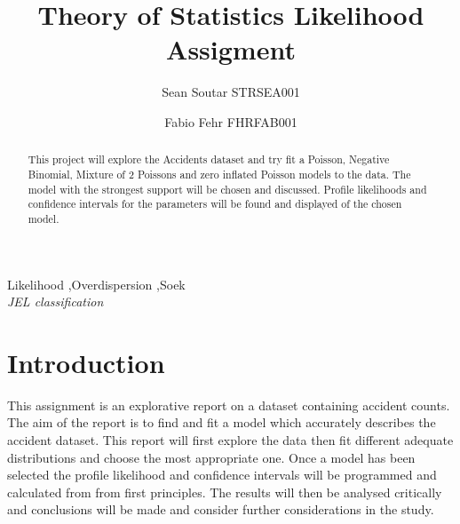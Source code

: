 \documentclass[11pt,preprint, authoryear]{elsarticle}
\numberwithin{equation}{section}
\numberwithin{figure}{section}
\numberwithin{table}{section}
\begin{document}
\begin{frontmatter}  %

\title{Theory of Statistics Likelihood Assigment}

\author[Add1]{Sean Soutar STRSEA001}

\author[Add2]{Fabio Fehr FHRFAB001}




\address[Add1]{UCT Statistics Honours, Cape Town, South Africa}
\address[Add2]{UCT Statistics Honours, Cape Town, South Africa}


\begin{abstract}
\small{
This project will explore the Accidents dataset and try fit a Poisson,
Negative Binomial, Mixture of 2 Poissons and zero inflated Poisson
models to the data. The model with the strongest support will be chosen
and discussed. Profile likelihoods and confidence intervals for the
parameters will be found and displayed of the chosen model.
}
\end{abstract}

\vspace{1cm}

\begin{keyword}
\footnotesize{
Likelihood \sep Overdispersion \sep Soek \\ \vspace{0.3cm}
\textit{JEL classification} 
}
\end{keyword}
\vspace{0.5cm}
\end{frontmatter}



\pagestyle{fancy}
\chead{}
\rhead{}
\lfoot{}
\lhead{}
\cfoot{}


\headsep 35pt %




\section{Introduction}\label{introduction}

This assignment is an explorative report on a dataset containing
accident counts. The aim of the report is to find and fit a model which
accurately describes the accident dataset. This report will first
explore the data then fit different adequate distributions and choose
the most appropriate one. Once a model has been selected the profile
likelihood and confidence intervals will be programmed and calculated
from from first principles. The results will then be analysed critically
and conclusions will be made and consider further considerations in the
study.
\end{document}
